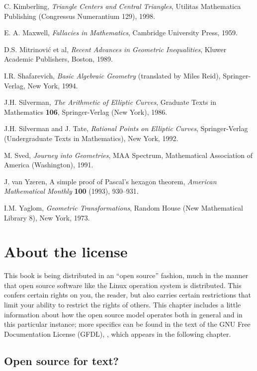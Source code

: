 \documentclass[12pt]{book}
\numberwithin{exc}{section}
\numberwithin{figure}{section}
\numberwithin{equation}{theorem}
\begin{document}
\begin{thebibliography}{99}
C. Kimberling, \textit{Triangle Centers and Central Triangles},
Utilitas Mathematica Publishing (Congressus Numerantium 129),
1998.

E. A. Maxwell, \textit{Fallacies in Mathematics},
Cambridge University Press, 1959.

D.S. Mitrinovi\'c et al, \textit{Recent Advances in Geometric Inequalities},
Kluwer Academic Publishers, Boston, 1989.

I.R. Shafarevich, \textit{Basic Algebraic Geometry} (translated
by Miles Reid), Springer-Verlag, New York, 1994.

J.H. Silverman, \textit{The Arithmetic of Elliptic Curves},
Graduate Texts in Mathematics \textbf{106}, Springer-Verlag (New York),
1986.

J.H. Silverman and J. Tate, \textit{Rational Points on Elliptic Curves}, Springer-Verlag (Undergraduate Texts in Mathematics), New York, 1992.

M. Sved, \textit{Journey into Geometries}, MAA Spectrum,
Mathematical Association of America (Washington), 1991.

J. van Yzeren, A simple proof of Pascal's hexagon theorem, 
\textit{American Mathematical Monthly} \textbf{100} (1993), 930--931.

I.M. Yaglom, \emph{Geometric Transformations}, Random House
(New Mathematical Library 8), New York, 1973.

\end{thebibliography}

\chapter{About the license}

This book is being distributed in an ``open source'' fashion, much in
the manner that open source software like the Linux operation system
is distributed. This confers certain rights on you, the reader, but also
carries certain restrictions that limit your ability to restrict the rights
of others. This chapter includes a little information about how the open
source model operates both in general and in this particular instance;
more specifics can be found in 
the text of the GNU Free Documentation License (GFDL),
, which appears in the following chapter.

\section{Open source for text?}
\end{document}
